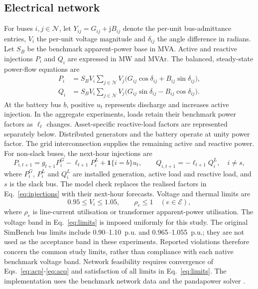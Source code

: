 \documentclass[preprint,12pt]{elsarticle}
\newcommand{\ind}{\mathbf{1}}
\begin{document}
\subsection{Electrical network}
For buses $i,j\in\mathcal N$, let $Y_{ij}=G_{ij}+\mathrm jB_{ij}$ denote the per-unit bus-admittance entries, $V_i$ the per-unit voltage magnitude and $\delta_{ij}$ the angle difference in radians. Let $S_B$ be the benchmark apparent-power base in MVA. Active and reactive injections $P_i$ and $Q_i$ are expressed in MW and MVAr. The balanced, steady-state power-flow equations are
\begin{align}
P_i&=S_BV_i\sum_{j\in\mathcal N}V_j\big(G_{ij}\cos\delta_{ij}+B_{ij}\sin\delta_{ij}\big),\label{eq:acp}\\
Q_i&=S_BV_i\sum_{j\in\mathcal N}V_j\big(G_{ij}\sin\delta_{ij}-B_{ij}\cos\delta_{ij}\big).\label{eq:acq}
\end{align}
At the battery bus $b$, positive $u_t$ represents discharge and increases active injection. In the aggregate experiments, loads retain their benchmark power factors as $\ell_t$ changes. Asset-specific reactive-load factors are represented separately below. Distributed generators and the battery operate at unity power factor. The grid interconnection supplies the remaining active and reactive power. For non-slack buses, the next-hour injections are
\begin{equation}
P_{i,t+1}=g_{t+1}P_i^G-\ell_{t+1}P_i^L+\ind\{i=b\}u_t,\qquad
Q_{i,t+1}=-\ell_{t+1}Q_i^L,\quad i\ne s,
\label{eq:injections}
\end{equation}
where $P_i^G$, $P_i^L$ and $Q_i^L$ are installed generation, active load and reactive load, and $s$ is the slack bus. The model check replaces the realised factors in Eq.~\eqref{eq:injections} with their next-hour forecasts. Voltage and thermal limits are
\begin{equation}
0.95\leq V_i\leq1.05,\qquad
\rho_e\leq1\quad(e\in\mathcal E),
\label{eq:limits}
\end{equation}
where $\rho_e$ is line-current utilisation or transformer apparent-power utilisation. The voltage band in Eq.~\eqref{eq:limits} is imposed uniformly for this study. The original SimBench bus limits include 0.90--1.10~p.u. and 0.965--1.055~p.u.; they are not used as the acceptance band in these experiments. Reported violations therefore concern the common study limits, rather than compliance with each native benchmark voltage band. Network feasibility requires convergence of Eqs.~\eqref{eq:acp}-\eqref{eq:acq} and satisfaction of all limits in Eq.~\eqref{eq:limits}. The implementation uses the benchmark network data and the pandapower solver \cite{baran,meinecke,thurner}.
\end{document}
